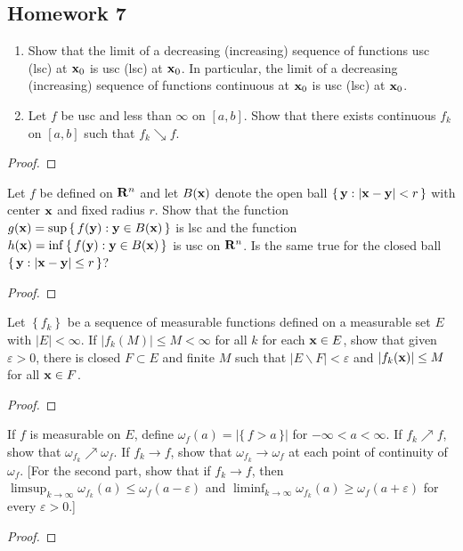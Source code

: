 \subsection{Homework 7}
\begin{problem}
\begin{enumerate}[label=(\alph*)]
\item Show that the limit of a decreasing (increasing) sequence of
  functions usc (lsc) at $\mathbf{x}_0$ is usc (lsc) at $\mathbf{x}_0$. In particular,
  the limit of a decreasing (increasing) sequence of functions continuous
  at $\mathbf{x}_0$ is usc (lsc) at $\mathbf{x}_0$.
\item Let $f$ be usc and less than $\infty$ on $[a,b]$. Show that there
  exists continuous $f_k$ on $[a,b]$ such that $f_k\searrow f$.
\end{enumerate}
\end{problem}
\begin{proof}
\end{proof}

\begin{problem}
Let $f$ be defined on $\mathbf{R}^n$ and let $B(\mathbf{x})$ denote the open ball
$\left\{\,\mathbf{y}:|\mathbf{x}-\mathbf{y}|<r\,\right\}$ with center
$\mathbf{x}$ and fixed radius $r$. Show that the function
$g(\mathbf{x})=\sup\left\{\,f(\mathbf{y}):\mathbf{y}\in B(\mathbf{x})\,\right\}$ is lsc
and the function $h(\mathbf{x})=\inf\left\{\,f(\mathbf{y}):\mathbf{y}\in
B(\mathbf{x})\,\right\}$ is usc on $\mathbf{R}^n$. Is the same true for the closed ball
$\left\{\,\mathbf{y}:|\mathbf{x}-\mathbf{y}|\leq r\,\right\}$?
\end{problem}
\begin{proof}
\end{proof}

\begin{problem}
Let $\left\{f_k\right\}$ be a sequence of measurable functions defined on a
measurable set $E$ with $|E|<\infty$. If $|f_k(M)|\leq M<\infty$ for all
$k$ for each $\mathbf{x}\in E$, show that given $\varepsilon>0$, there is closed
$F\subset E$ and finite $M$ such that $|E\smallsetminus F|<\varepsilon$ and
$|f_k(\mathbf{x})|\leq M$ for all $\mathbf{x}\in F$.
\end{problem}
\begin{proof}
\end{proof}

\begin{problem}
If $f$ is measurable on $E$, define
$\omega_f(a)=|\{\,f>a\,\}|$ for
$-\infty<a<\infty$. If $f_k\nearrow f$, show that
$\omega_{f_k}\nearrow\omega_f$. If $f_k\to f$, show that
$\omega_{f_k}\to\omega_f$ at each point of continuity of $\omega_f$. [For
the second part, show that if $f_k\to f$, then
$\limsup_{k\to\infty}\omega_{f_k}(a)\leq\omega_f(a-\varepsilon)$ and
$\liminf_{k\to\infty}\omega_{f_k}(a)\geq\omega_f(a+\varepsilon)$ for every
$\varepsilon>0$.]
\end{problem}
\begin{proof}
\end{proof}

